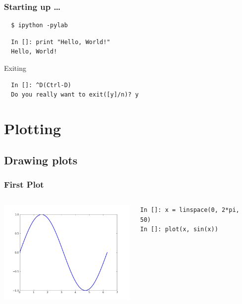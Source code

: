 \documentclass[14pt,compress]{beamer}
\begin{document}
\begin{frame}[fragile]
\frametitle{Starting up \ldots}
\begin{block}{}
\begin{lstlisting}
  $ ipython -pylab  
\end{lstlisting} %
\end{block}
\begin{lstlisting}     
  In []: print "Hello, World!"
  Hello, World!
\end{lstlisting}
Exiting
\begin{lstlisting}     
  In []: ^D(Ctrl-D)
  Do you really want to exit([y]/n)? y
\end{lstlisting}
\end{frame}



\section{Plotting}

\subsection{Drawing plots}
\begin{frame}[fragile]
\frametitle{First Plot}
\begin{columns}
    \hspace*{-0.5in}
  \includegraphics[height=2in, interpolate=true]{data/firstplot}
    \begin{block}{}
    \begin{small}
\begin{lstlisting}
In []: x = linspace(0, 2*pi, 50)
In []: plot(x, sin(x))
\end{lstlisting}
    \end{small}
    \end{block}
\end{columns}
\end{frame}
\end{document}
